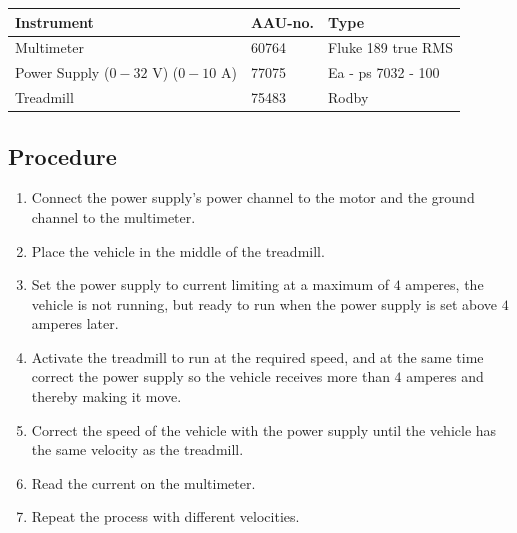 \begin{table}[H]
\begin{tabular}{|l|l|p{4cm}|}
\hline%
  \textbf{Instrument}                       &  \textbf{AAU-no.}  &  \textbf{Type}         \\
\hline%
  Multimeter                                &  60764             &  Fluke 189 true RMS    \\
\hline%
  Power Supply ($0 - 32$ V) ($0 - 10$ A)    &  77075             &  Ea - ps 7032 - 100    \\
\hline%
  Treadmill                                 &  75483             &  Rodby                 \\
\hline%
\end{tabular}
\end{table}

\subsection{Procedure}

\begin{enumerate}
  \item Connect the power supply's power channel to the motor and the ground channel to the multimeter.
  \item Place the vehicle in the middle of the treadmill.
  \item Set the power supply to current limiting at a maximum of $4$ amperes, the vehicle is not running, but ready to run when the power supply is set above $4$ amperes later. 
  \item Activate the treadmill to run at the required speed, and at the same time correct the power supply so the vehicle receives more than $4$ amperes and thereby making it move.
  \item Correct the speed of the vehicle with the power supply until the vehicle has the same velocity as the treadmill.
  \item Read the current on the multimeter.
  \item Repeat the process with different velocities.
\end{enumerate}

